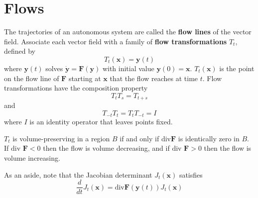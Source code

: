 \documentclass[11pt]{article}
\begin{document}
\section{Flows}
	The trajectories of an autonomous system are called the \textbf{flow lines} of the vector field. Associate each vector field with a family of \textbf{flow transformations} $T_t$, defined by 
	\begin{equation}
		T_t(\mathbf{x}) = \mathbf{y}(t)
	\end{equation}
	where $\mathbf{y}(t)$ solves $\dot{\mathbf{y}} = \mathbf{F}(\mathbf{y})$ with initial value $\mathbf{y}(0) = \mathbf{x}$. $T_t(\mathbf{x})$ is the point on the flow line of $\mathbf{F}$ starting at $\mathbf{x}$ that the flow reaches at time $t$. Flow transformations have the composition property
	\begin{equation}
		T_tT_s = T_{t+s}
	\end{equation}
	and
	\begin{equation}
		T_{-t}T_t = T_tT_{-t} = I
	\end{equation}
	where $I$ is an identity operator that leaves points fixed.
	
	$T_t$ is volume-preserving in a region $B$ if and only if $\text{div}\mathbf{F}$ is identically zero in $B$. If $\text{div }\mathbf{F} < 0$ then the flow is volume decreasing, and if $\text{div }\mathbf{F} > 0$ then the flow is volume increasing.
	
	As an aside, note that the Jacobian determinant $J_t(\mathbf{x})$ satisfies
	\begin{equation}
		\frac{d}{dt}J_t(\mathbf{x}) = \text{div}\mathbf{F}(\mathbf{y}(t))J_t(\mathbf{x})
	\end{equation}
%		
%		


\end{document}
